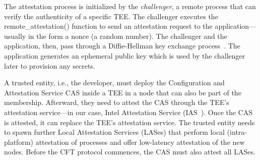 The attestation process is initialized by the \emph{challenger}, a remote process that can verify the authenticity of a specific TEE. The challenger executes the remote\_attestation() function to send an attestation request to the application---usually in the form a nonce (a random number). The challenger and the application, then, pass through a Diffie-Hellman key exchange process~\cite{10.1145/359460.359473}. The application generates an ephemeral public key which is used by the challenger later to provision any secrets.




A trusted entity, i.e., the developer, must deploy the  Configuration and Attestation Service  CAS inside a TEE in a node that can also be part of the membership. Afterward, they need to attest the CAS through the TEE's attestation service---in our case, Intel Attestation Service (IAS~\cite{ias}). Once the CAS is attested, it can replace the TEE's attestation service. The trusted entity needs to spawn further Local Attestation Services (LASes) that perform local (intra-platform) attestation of processes and offer low-latency attestation of the new nodes. Before the CFT protocol commences, the CAS must also attest all LASes. 


